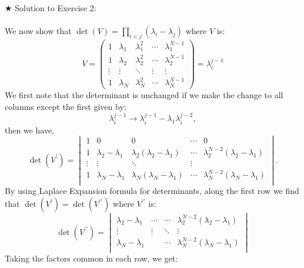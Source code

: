 \documentclass[11pt]{article}
\begin{document}
\noindent $\bigstar$ Solution to Exercise 2:
\\ \\ 
We now show that $\det(V) = \prod_{i<j} (\lambda_i - \lambda_j)$ where $V$ is: 
\begin{equation*}
	V = 
	\begin{pmatrix}
		1 & \lambda_1 & \lambda_{1}^{2} & \cdots & \lambda_{1}^{N-1} \\
		1 & \lambda_2 & \lambda_{2}^{2} & \cdots & \lambda_{2}^{N-1} \\ 
		\vdots  & \vdots  & \ddots & \vdots & \vdots \\
		1 & \lambda_N & \lambda_{N}^{2} & \cdots & \lambda_{N}^{N-1} 
	\end{pmatrix} = \lambda_{i}^{j-1} 
\end{equation*}
We first note that the determinant is unchanged
if we make the change to all columns except the first given by:
\begin{equation}
	\lambda_{i}^{j-1} \to \lambda_{i}^{j-1} - \lambda_{1} \lambda_{i}^{j-2},
\end{equation}
then we have, 
\begin{equation}
	\det(V^{\prime}) = 
	\begin{vmatrix}
		1 & 0 & 0 & \cdots & 0 \\
		1 & \lambda_2 - \lambda_1 & \lambda_2(\lambda_2 - \lambda_1) & \cdots & \lambda_2^{N-2}(\lambda_2 - \lambda_1) \\ 
		\vdots  & \vdots  & \ddots & \vdots  \\
		1 & \lambda_N - \lambda_1 & \lambda_N(\lambda_N - \lambda_1) & \cdots & \lambda_N^{N-2}(\lambda_N - \lambda_1) \\
	\end{vmatrix}.
\end{equation}
By using Laplace Expansion formula for determinants, along the first row we find that $\det(V^{\prime}) = \det(V^{\prime\prime})$ where $V^{\prime\prime}$ is:
\begin{equation}
	\det(V^{\prime\prime}) = 
	\begin{vmatrix}
		 \lambda_2 - \lambda_1 & \cdots & \cdots & \lambda_2^{N-2}(\lambda_2 - \lambda_1) \\ 
		\vdots  & \vdots  & \ddots & \vdots  \\
		\lambda_N - \lambda_1 &  & \cdots &  \lambda_N^{N-2}(\lambda_N - \lambda_1) \\
	\end{vmatrix}
\end{equation}
Taking the factors common in each row, we get:
\end{document}
